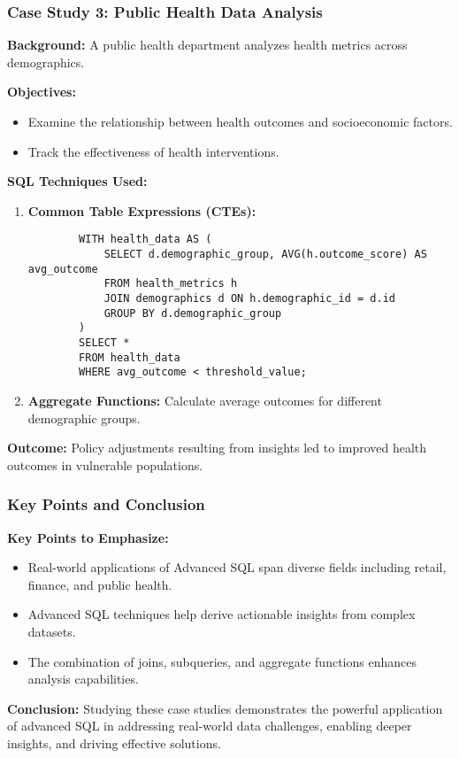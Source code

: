 \documentclass[aspectratio=169]{beamer}
\begin{document}
\begin{frame}[fragile]
    \frametitle{Case Study 3: Public Health Data Analysis}
    
    \textbf{Background:} A public health department analyzes health metrics across demographics.
    
    \textbf{Objectives:}
    \begin{itemize}
        \item Examine the relationship between health outcomes and socioeconomic factors.
        \item Track the effectiveness of health interventions.
    \end{itemize}
    
    \textbf{SQL Techniques Used:}
    \begin{enumerate}
        \item \textbf{Common Table Expressions (CTEs):}
        \begin{lstlisting}
        WITH health_data AS (
            SELECT d.demographic_group, AVG(h.outcome_score) AS avg_outcome
            FROM health_metrics h
            JOIN demographics d ON h.demographic_id = d.id
            GROUP BY d.demographic_group
        )
        SELECT *
        FROM health_data
        WHERE avg_outcome < threshold_value;
        \end{lstlisting}
        
        \item \textbf{Aggregate Functions:} 
        Calculate average outcomes for different demographic groups.
    \end{enumerate}
    
    \textbf{Outcome:} Policy adjustments resulting from insights led to improved health outcomes in vulnerable populations.
\end{frame}

\begin{frame}[fragile]
    \frametitle{Key Points and Conclusion}
    
    \textbf{Key Points to Emphasize:}
    \begin{itemize}
        \item Real-world applications of Advanced SQL span diverse fields including retail, finance, and public health.
        \item Advanced SQL techniques help derive actionable insights from complex datasets.
        \item The combination of joins, subqueries, and aggregate functions enhances analysis capabilities.
    \end{itemize}
    
    \textbf{Conclusion:} 
    Studying these case studies demonstrates the powerful application of advanced SQL in addressing real-world data challenges, enabling deeper insights, and driving effective solutions.
\end{frame}
\end{document}
